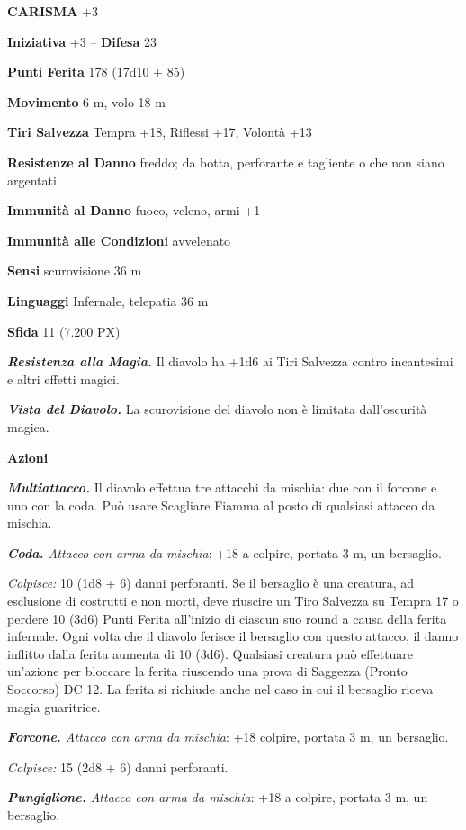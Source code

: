 \begin{multicols}{2}
	\textbf{CARISMA} +3

	\textbf{Iniziativa} +3 -- \textbf{Difesa} 23

	\textbf{Punti Ferita} 178 (17d10 + 85)

	\textbf{Movimento} 6 m, volo 18 m

	\textbf{Tiri Salvezza} Tempra +18, Riflessi +17, Volontà +13

	\textbf{Resistenze al Danno} freddo; da botta, perforante e tagliente o che non siano argentati

	\textbf{Immunità al Danno} fuoco, veleno, armi +1

	\textbf{Immunità alle Condizioni} avvelenato

	\textbf{Sensi} scurovisione 36 m

	\textbf{Linguaggi} Infernale, telepatia 36 m

	\textbf{Sfida} 11 (7.200 PX)

	\textit{\textbf{Resistenza alla Magia.}} Il diavolo ha +1d6 ai Tiri Salvezza contro incantesimi e altri effetti magici.

	\textit{\textbf{Vista del Diavolo.}} La scurovisione del diavolo non è limitata dall'oscurità magica.

	\textbf{Azioni}

	\textit{\textbf{Multiattacco.}} Il diavolo effettua tre attacchi da mischia: due con il forcone e uno con la coda. Può usare Scagliare Fiamma al posto di qualsiasi attacco da mischia.

	\textit{\textbf{Coda.} Attacco con arma da mischia}: +18 a colpire, portata 3 m, un bersaglio.

	\textit{Colpisce:} 10 (1d8 + 6) danni perforanti. Se il bersaglio è una creatura, ad esclusione di costrutti e non morti, deve riuscire un Tiro Salvezza su Tempra 17 o perdere 10 (3d6) Punti Ferita all'inizio di ciascun suo round a causa della ferita infernale. Ogni volta che il diavolo ferisce il bersaglio con questo attacco, il danno inflitto dalla ferita aumenta di 10 (3d6). Qualsiasi creatura può effettuare un'azione per bloccare la ferita riuscendo una prova di Saggezza (Pronto Soccorso) DC 12. La ferita si richiude anche nel caso in cui il bersaglio riceva magia guaritrice.

	\textit{\textbf{Forcone.} Attacco con arma da mischia}: +18 colpire, portata 3 m, un bersaglio.

	\textit{Colpisce:} 15 (2d8 + 6) danni perforanti.

	\textit{\textbf{Pungiglione.} Attacco con arma da mischia}: +18 a colpire, portata 3 m, un bersaglio.


\end{multicols}
